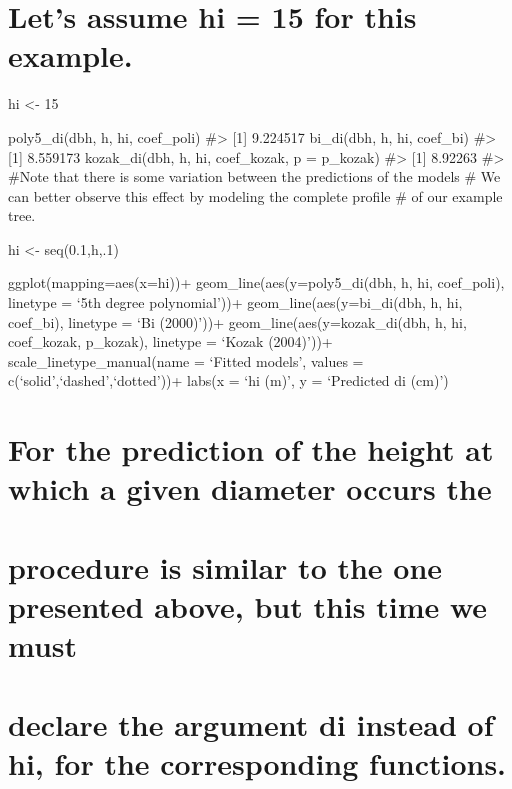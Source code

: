 \documentclass[
]{article}
\begin{document}
\hypertarget{lets-assume-hi-15-for-this-example.}{%
\section{Let's assume hi = 15 for this
example.}\label{lets-assume-hi-15-for-this-example.}}

hi \textless- 15

poly5\_di(dbh, h, hi, coef\_poli) \#\textgreater{} {[}1{]} 9.224517
bi\_di(dbh, h, hi, coef\_bi) \#\textgreater{} {[}1{]} 8.559173
kozak\_di(dbh, h, hi, coef\_kozak, p = p\_kozak) \#\textgreater{}
{[}1{]} 8.92263 \#\textgreater{} \#Note that there is some variation
between the predictions of the models \# We can better observe this
effect by modeling the complete profile \# of our example tree.

hi \textless- seq(0.1,h,.1)

ggplot(mapping=aes(x=hi))+ geom\_line(aes(y=poly5\_di(dbh, h, hi,
coef\_poli), linetype = `5th degree polynomial'))+
geom\_line(aes(y=bi\_di(dbh, h, hi, coef\_bi), linetype = `Bi (2000)'))+
geom\_line(aes(y=kozak\_di(dbh, h, hi, coef\_kozak, p\_kozak), linetype
= `Kozak (2004)'))+ scale\_linetype\_manual(name = `Fitted models',
values = c(`solid',`dashed',`dotted'))+ labs(x = `hi (m)', y =
`Predicted di (cm)')

\hypertarget{for-the-prediction-of-the-height-at-which-a-given-diameter-occurs-the}{%
\section{For the prediction of the height at which a given diameter
occurs
the}\label{for-the-prediction-of-the-height-at-which-a-given-diameter-occurs-the}}

\hypertarget{procedure-is-similar-to-the-one-presented-above-but-this-time-we-must}{%
\section{procedure is similar to the one presented above, but this time
we
must}\label{procedure-is-similar-to-the-one-presented-above-but-this-time-we-must}}

\hypertarget{declare-the-argument-di-instead-of-hi-for-the-corresponding-functions.}{%
\section{declare the argument di instead of hi, for the corresponding
functions.}\label{declare-the-argument-di-instead-of-hi-for-the-corresponding-functions.}}
\end{document}
